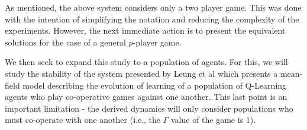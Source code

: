 \documentclass[.../main.tex]{subfiles}
\begin{document}
    As mentioned, the above system considers only a two player game. This was done with the intention
    of simplifying the notation and reducing the complexity of the experiments. However, the next
    immediate action is to present the equivalent solutions for the case of a general $p$-player
    game.
    
    We then seek to expand this study to a population of agents. For
    this, we will study the stability of the system presented by Leung
    et al \cite{Hu2019} which presents a mean-field model describing
    the evolution of learning of a population of Q-Learning agents who
    play co-operative games against one another. This last point is an
    important limitation - the derived dynamics will only consider
    populations who must co-operate with one another (i.e., the
    $\Gamma$ value of the game is 1).
\end{document}
